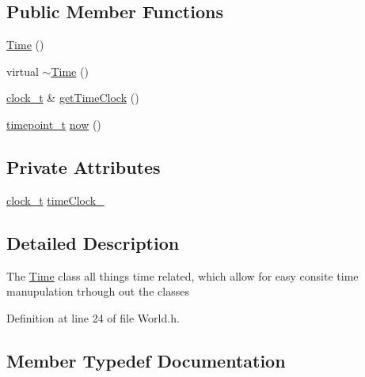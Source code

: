\subsection*{Public Member Functions}
\begin{DoxyCompactItemize}
\item 
\hyperlink{classo_cpt_1_1_world_1_1_time_a831b0a1d8bd9ebe4ebe0111bd4516eb5}{Time} ()
\item 
virtual \hyperlink{classo_cpt_1_1_world_1_1_time_a18956e4ec6a4fb4cc3a2067c9163d75d}{$\sim$\+Time} ()
\item 
\hyperlink{classo_cpt_1_1_world_1_1_time_ac41de01610f32d0ace4844ed3bf454f7}{clock\+\_\+t} \& \hyperlink{classo_cpt_1_1_world_1_1_time_a6fddffab679f3577de92c5ddf6f15f47}{get\+Time\+Clock} ()
\item 
\hyperlink{classo_cpt_1_1_world_1_1_time_a6a6e782c3c90622c1c7070b0a223ec4c}{timepoint\+\_\+t} \hyperlink{classo_cpt_1_1_world_1_1_time_a5f2069131e8ef21cb6e555fd633986fb}{now} ()
\end{DoxyCompactItemize}
\subsection*{Private Attributes}
\begin{DoxyCompactItemize}
\item 
\hyperlink{classo_cpt_1_1_world_1_1_time_ac41de01610f32d0ace4844ed3bf454f7}{clock\+\_\+t} \hyperlink{classo_cpt_1_1_world_1_1_time_a219308dd501f332e4d49f30ad4e5206e}{time\+Clock\+\_\+}
\end{DoxyCompactItemize}


\subsection{Detailed Description}
The \hyperlink{classo_cpt_1_1_world_1_1_time}{Time} class all things time related, which allow for easy consite time manupulation trhough out the classes 

Definition at line 24 of file World.\+h.



\subsection{Member Typedef Documentation}
\hypertarget{classo_cpt_1_1_world_1_1_time_ac41de01610f32d0ace4844ed3bf454f7}{}\label{classo_cpt_1_1_world_1_1_time_ac41de01610f32d0ace4844ed3bf454f7} 
